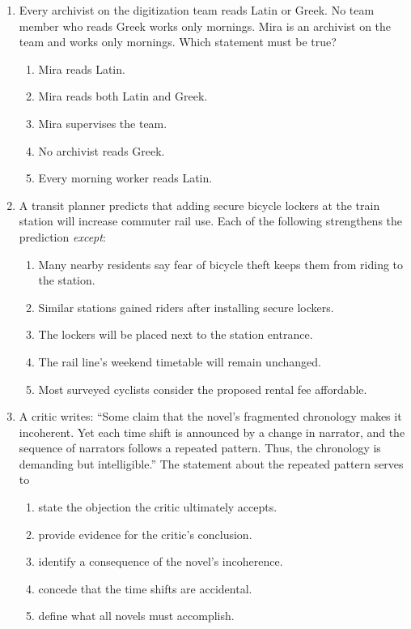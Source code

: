 \begin{enumerate}
\item Every archivist on the digitization team reads Latin or Greek. No team
member who reads Greek works only mornings. Mira is an archivist on the team and
works only mornings. Which statement must be true?
  \begin{enumerate}
  \item Mira reads Latin.
  \item Mira reads both Latin and Greek.
  \item Mira supervises the team.
  \item No archivist reads Greek.
  \item Every morning worker reads Latin.
  \end{enumerate}

\item A transit planner predicts that adding secure bicycle lockers at the train
station will increase commuter rail use. Each of the following strengthens the
prediction \emph{except}:
  \begin{enumerate}
  \item Many nearby residents say fear of bicycle theft keeps them from riding
        to the station.
  \item Similar stations gained riders after installing secure lockers.
  \item The lockers will be placed next to the station entrance.
  \item The rail line's weekend timetable will remain unchanged.
  \item Most surveyed cyclists consider the proposed rental fee affordable.
  \end{enumerate}

\item A critic writes: ``Some claim that the novel's fragmented chronology makes
it incoherent. Yet each time shift is announced by a change in narrator, and the
sequence of narrators follows a repeated pattern. Thus, the chronology is
demanding but intelligible.'' The statement about the repeated pattern serves to
  \begin{enumerate}
  \item state the objection the critic ultimately accepts.
  \item provide evidence for the critic's conclusion.
  \item identify a consequence of the novel's incoherence.
  \item concede that the time shifts are accidental.
  \item define what all novels must accomplish.
  \end{enumerate}


\end{enumerate}
